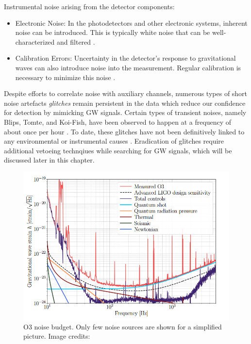 Instrumental noise arising from the detector components:
\begin{itemize}
    \item  Electronic Noise: In the photodetectors and other electronic systems, inherent noise can be introduced. This is typically white noise that can be well-characterized and filtered \cite{Kondrashov:2008zr}.
    \item Calibration Errors: Uncertainty in the detector's response to gravitational waves can also introduce noise into the measurement. Regular calibration is necessary to minimize this noise \cite{Sun:2020wke}.
\end{itemize}

Despite efforts to correlate noise with auxiliary channels, numerous types of short noise artefacts \textit{glitches} remain persistent in the data which reduce our confidence for detection by mimicking GW signals. Certain types of transient noises, namely Blips, Tomte, and Koi-Fish, have been observed to happen at a frequency of about once per hour \cite{Cabero:2019orq}. To date, these glitches have not been definitively linked to any environmental or instrumental causes \cite{Cabero:2019orq}. Eradication of glitches require additional vetoeing technqiues while searching for GW signals, which will be discussed later in this chapter.  

\begin{figure}
    \centering
    \includegraphics[width=\textwidth]{figures/basic_data_analysis/O3_noise_budget.PNG}
    \caption{O3 noise budget. Only few noise sources are shown for a simplified picture. Image credits: \cite{aLIGO:2020wna}}
    \label{fig:O3_noise_budget}
\end{figure}



